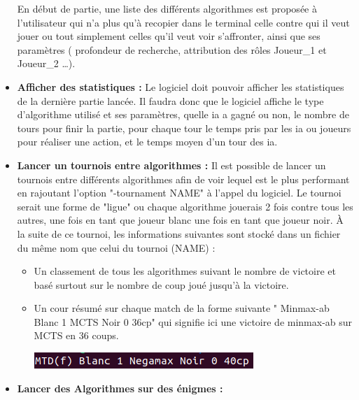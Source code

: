 \documentclass{article}
\begin{document}
\begin{itemize}
        \newline
        En début de partie, une liste des différents algorithmes est proposée à l'utilisateur qui n'a plus qu'à recopier dans le terminal celle contre qui il veut jouer ou tout simplement celles qu'il veut voir s'affronter, ainsi que ses paramètres ( profondeur de recherche, attribution des rôles Joueur\_1 et Joueur\_2 \dots).
    \medskip
    \item \textbf{Afficher des statistiques :
    }
        \newline
        Le logiciel doit pouvoir afficher les statistiques de la dernière partie lancée. 
        \newline
        Il faudra donc que le logiciel affiche le type d'algorithme utilisé et ses paramètres, quelle ia a gagné ou non, le nombre de tours pour finir la partie, pour chaque tour le temps pris par les ia ou joueurs pour réaliser une action, et le temps moyen d'un tour des ia.
    \medskip
    \item \textbf{Lancer un tournois entre algorithmes : }
    \newline
        Il est possible de lancer un tournois entre différents algorithmes afin de voir lequel est le plus performant en rajoutant l'option "-tournament NAME" à l'appel du logiciel.
        Le tournoi serait une forme de "ligue" ou chaque algorithme jouerais 2 fois contre tous les autres, une fois en tant que joueur blanc une fois en tant que joueur noir.
        \newline
        À la suite de ce tournoi, les informations suivantes sont stocké dans un fichier du même nom que celui du tournoi (NAME) :
        \begin{itemize}
            \item Un classement de tous les algorithmes suivant le nombre de victoire et basé surtout sur le nombre de coup joué jusqu'à la victoire.
            \item Un cour résumé sur chaque match de la forme suivante " Minmax-ab Blanc 1 MCTS Noir 0 36cp" qui signifie ici une victoire de minmax-ab sur MCTS en 36 coups.
            \newline
            \centerline{\includegraphics[scale = 0.5]{img/Summarytournament.png}}
        \end{itemize}
    \medskip
    \item \textbf{Lancer des Algorithmes sur des énigmes : }

\end{itemize}
\end{document}
